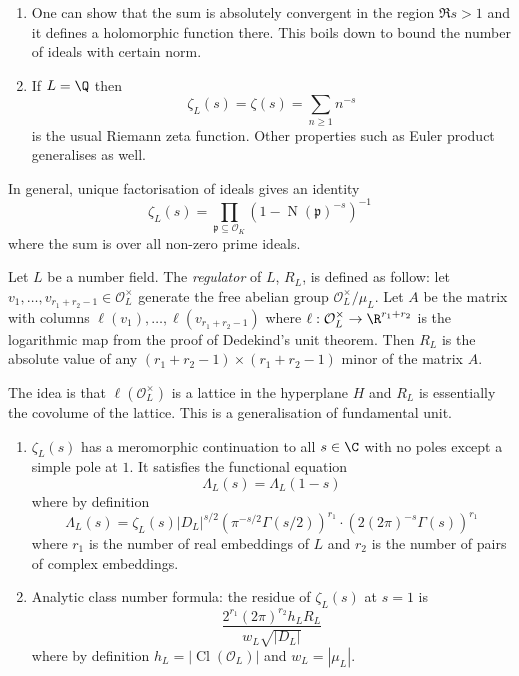 \documentclass[a4paper]{article}
\renewcommand*{\O}{\mathcal{O}}
\DeclareMathOperator{\n}{N}
\DeclareMathOperator{\Cl}{Cl} %
\begin{document}
\begin{note}\leavevmode
  \begin{enumerate}
  \item One can show that the sum is absolutely convergent in the region \(\Re s > 1\) and it defines a holomorphic function there. This boils down to bound the number of ideals with certain norm.
  \item If \(L = \Q\) then
\[
  \zeta_L(s) = \zeta(s) = \sum_{n \geq 1} n^{-s}
\]
is the usual Riemann zeta function. Other properties such as Euler product generalises as well.
  \end{enumerate}
\end{note}

In general, unique factorisation of ideals gives an identity
\[
  \zeta_L(s) = \prod_{\mathfrak p \subseteq \O_K} (1 - \n(\mathfrak p)^{-s})^{-1}
\]
where the sum is over all non-zero prime ideals.

\begin{definition}[Regulator]
  Let \(L\) be a number field. The \emph{regulator} of \(L\), \(R_L\), is defined as follow: let \(v_1, \dots, v_{r_1 + r_2 - 1} \in \O_L^\times\) generate the free abelian group \(\O_L^\times/\mu_L\). Let \(A\) be the matrix with columns \(\ell(v_1), \dots, \ell(v_{r_1 + r_2 - 1})\) where \(\ell: \O_L^\times \to \R^{r_1 + r_2}\) is the logarithmic map from the proof of Dedekind's unit theorem. Then \(R_L\) is the absolute value of any \((r_1 + r_2 - 1) \times (r_1 + r_2 - 1)\) minor of the matrix \(A\).
\end{definition}

The idea is that \(\ell(\O_L^\times)\) is a lattice in the hyperplane \(H\) and \(R_L\) is essentially the covolume of the lattice. This is a generalisation of fundamental unit.

\begin{theorem}\leavevmode
  \begin{enumerate}
  \item \(\zeta_L(s)\) has a meromorphic continuation to all \(s \in \C\) with no poles except a simple pole at \(1\). It satisfies the functional equation
    \[
      \Lambda_L(s) = \Lambda_L(1 - s)
    \]
    where by definition
    \[
      \Lambda_L(s) = \zeta_L(s) |D_L|^{s/2} (\pi^{-s/2} \Gamma(s/2))^{r_1} \cdot (2 (2\pi)^{-s} \Gamma(s))^{r_1}
    \]
    where \(r_1\) is the number of real embeddings of \(L\) and \(r_2\) is the number of pairs of complex embeddings.
  \item Analytic class number formula: the residue of \(\zeta_L(s)\) at \(s = 1\) is
    \[
      \frac{2^{r_1} (2\pi)^{r_2} h_L R_L}{w_L \sqrt{|D_L|}}
    \]
    where by definition \(h_L = |\Cl(\O_L)|\) and \(w_L = |\mu_L|\).
  \end{enumerate}
\end{theorem}
\end{document}

